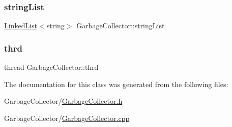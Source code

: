 \subsubsection{\texorpdfstring{string\+List}{stringList}}
{\footnotesize\ttfamily \hyperlink{class_linked_list}{Linked\+List}$<$string$>$ Garbage\+Collector\+::string\+List}

\mbox{\label{class_garbage_collector_a7721f0c6f099fe71c61fd7e7bd0f6aae}} 
\subsubsection{\texorpdfstring{thrd}{thrd}}
{\footnotesize\ttfamily thread Garbage\+Collector\+::thrd}



The documentation for this class was generated from the following files\+:\begin{DoxyCompactItemize}
\item 
Garbage\+Collector/\hyperlink{_garbage_collector_8h}{Garbage\+Collector.\+h}\item 
Garbage\+Collector/\hyperlink{_garbage_collector_8cpp}{Garbage\+Collector.\+cpp}\end{DoxyCompactItemize}
